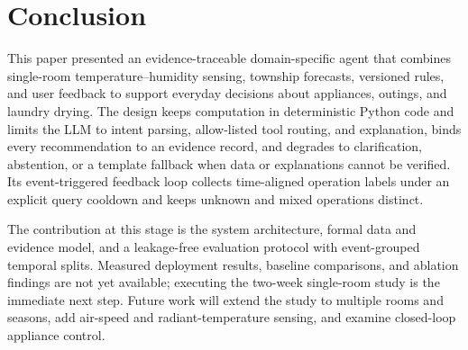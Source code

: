 \section{Conclusion}\label{sec:conclusion}
This paper presented an evidence-traceable domain-specific agent that combines single-room temperature--humidity sensing, township forecasts, versioned rules, and user feedback to support everyday decisions about appliances, outings, and laundry drying. The design keeps computation in deterministic Python code and limits the LLM to intent parsing, allow-listed tool routing, and explanation, binds every recommendation to an evidence record, and degrades to clarification, abstention, or a template fallback when data or explanations cannot be verified. Its event-triggered feedback loop collects time-aligned operation labels under an explicit query cooldown and keeps unknown and mixed operations distinct.

The contribution at this stage is the system architecture, formal data and evidence model, and a leakage-free evaluation protocol with event-grouped temporal splits. Measured deployment results, baseline comparisons, and ablation findings are not yet available; executing the two-week single-room study is the immediate next step. Future work will extend the study to multiple rooms and seasons, add air-speed and radiant-temperature sensing, and examine closed-loop appliance control.
